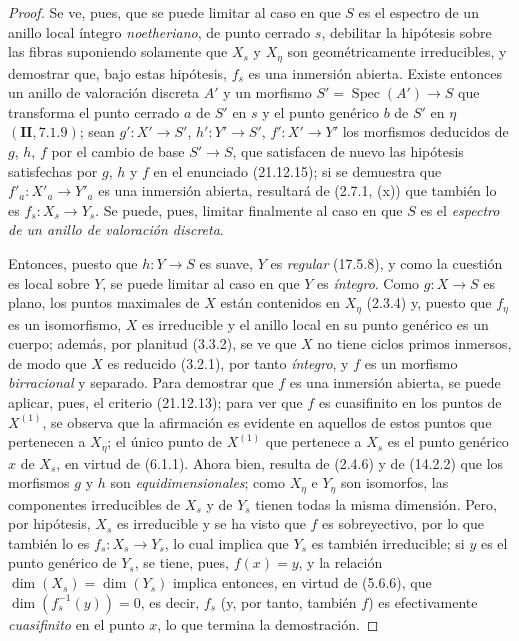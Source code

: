 \begin{proof}
Se ve, pues, que se puede limitar al caso en que $S$ es el espectro de un anillo local íntegro
\emph{noetheriano}, de punto cerrado $s$, debilitar la hipótesis sobre las fibras suponiendo solamente
que $X_s$ y $X_\eta$ son geométricamente irreducibles, y demostrar que, bajo estas
hipótesis, $f_s$ es una inmersión abierta. Existe entonces un anillo de valoración discreta
$A'$ y un morfismo $S'=\operatorname{Spec}(A')\to S$ que transforma el punto cerrado
$a$ de $S'$ en $s$ y el punto genérico $b$ de $S'$ en $\eta$ $(\mathbf{II}, 7.1.9)$;
sean $g':X'\to S'$, $h':Y'\to S'$, $f':X'\to Y'$ los morfismos deducidos de $g$,
$h$, $f$ por el cambio de base $S'\to S$, que satisfacen de nuevo las hipótesis
satisfechas por $g$, $h$ y $f$ en el enunciado (21.12.15); si se demuestra que
$f'_a:X'_a\to Y'_a$ es una inmersión abierta, resultará de (2.7.1, (x)) que también
lo es $f_s:X_s\to Y_s$. Se puede, pues, limitar finalmente al caso en que $S$ es
el \emph{espectro de un anillo de valoración discreta}.

Entonces, puesto que $h:Y\to S$ es suave, $Y$ es \emph{regular} (17.5.8), y como la cuestión
es local sobre $Y$, se puede limitar al caso en que $Y$ es \emph{íntegro}. Como $g:X\to S$ es
plano, los puntos maximales de $X$ están contenidos en $X_\eta$ (2.3.4) y, puesto que
$f_\eta$ es un isomorfismo, $X$ es irreducible y el anillo local en su punto
genérico es un cuerpo; además, por planitud (3.3.2), se ve que $X$ no tiene ciclos
primos inmersos, de modo que $X$ es reducido (3.2.1), por tanto \emph{íntegro}, y $f$ es un
morfismo \emph{birracional} y separado. Para demostrar que $f$ es una inmersión abierta, se puede
aplicar, pues, el criterio (21.12.13); para ver que $f$ es cuasifinito en los puntos de
$X^{(1)}$, se observa que la afirmación es evidente en aquellos de estos puntos que
pertenecen a $X_\eta$; el único punto de $X^{(1)}$ que pertenece a $X_s$ es el punto
genérico $x$ de $X_s$, en virtud de (6.1.1). Ahora bien, resulta de (2.4.6) y de (14.2.2)
que los morfismos $g$ y $h$ son \emph{equidimensionales}; como $X_\eta$ e $Y_\eta$ son
isomorfos, las componentes irreducibles de $X_s$ y de $Y_s$ tienen todas la misma
dimensión. Pero, por hipótesis, $X_s$ es irreducible y se ha visto que $f$ es sobreyectivo,
por lo que también lo es $f_s:X_s\to Y_s$, lo cual implica que $Y_s$ es también
irreducible; si $y$ es el punto genérico de $Y_s$, se tiene, pues, $f(x)=y$, y la relación
$\dim(X_s)=\dim(Y_s)$ implica entonces, en virtud de (5.6.6), que
$\dim(f_s^{-1}(y))=0$, es decir, $f_s$ (y, por tanto, también $f$) es efectivamente \emph{cuasifinito}
en el punto $x$, lo que termina la demostración.
\end{proof}

